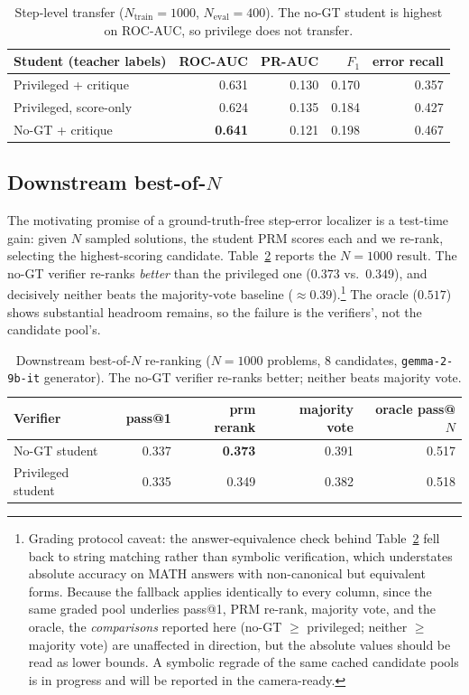 \documentclass{article}
\begin{document}
\begin{table}[t]
\centering
\small
\begin{tabular}{lrrrr}
\toprule
Student (teacher labels) & ROC-AUC & PR-AUC & $F_1$ & error recall \\
\midrule
Privileged + critique & 0.631 & 0.130 & 0.170 & 0.357 \\
Privileged, score-only & 0.624 & 0.135 & 0.184 & 0.427 \\
No-GT + critique & \textbf{0.641} & 0.121 & 0.198 & 0.467 \\
\bottomrule
\end{tabular}
\caption{Step-level transfer ($N_\text{train}=1000$, $N_\text{eval}=400$).
The no-GT student is highest on ROC-AUC, so privilege does not transfer.}
\label{tab:step-transfer}
\end{table}

\subsection{Downstream best-of-$N$}
The motivating promise of a ground-truth-free step-error localizer is a
test-time gain: given $N$ sampled solutions, the student PRM scores each and
we re-rank, selecting the highest-scoring candidate. Table~\ref{tab:bon}
reports the $N=1000$ result. The no-GT verifier re-ranks \emph{better} than
the privileged one ($0.373$ vs.\ $0.349$), and decisively neither beats the
majority-vote baseline ($\approx 0.39$).\footnote{Grading protocol caveat: the
answer-equivalence check behind Table~\ref{tab:bon} fell back to string
matching rather than symbolic verification, which understates absolute accuracy
on MATH answers with non-canonical but equivalent forms. Because the fallback
applies identically to every column, since the same graded pool underlies
pass@1, PRM re-rank, majority vote, and the oracle, the \emph{comparisons} reported
here (no-GT $\geq$ privileged; neither $\geq$ majority vote) are unaffected in
direction, but the absolute values should be read as lower bounds. A symbolic
regrade of the same cached candidate pools is in progress and will be reported
in the camera-ready.} The oracle ($0.517$) shows substantial headroom remains,
so the failure is the verifiers', not the candidate pool's.

\begin{table}[t]
\centering
\small
\begin{tabular}{lrrrr}
\toprule
Verifier & pass@1 & prm rerank & majority vote & oracle pass@$N$ \\
\midrule
No-GT student & 0.337 & \textbf{0.373} & 0.391 & 0.517 \\
Privileged student & 0.335 & 0.349 & 0.382 & 0.518 \\
\bottomrule
\end{tabular}
\caption{Downstream best-of-$N$ re-ranking ($N=1000$ problems, 8 candidates,
\texttt{gemma-2-9b-it} generator). The no-GT verifier re-ranks better;
neither beats majority vote.}
\label{tab:bon}
\end{table}
\end{document}
